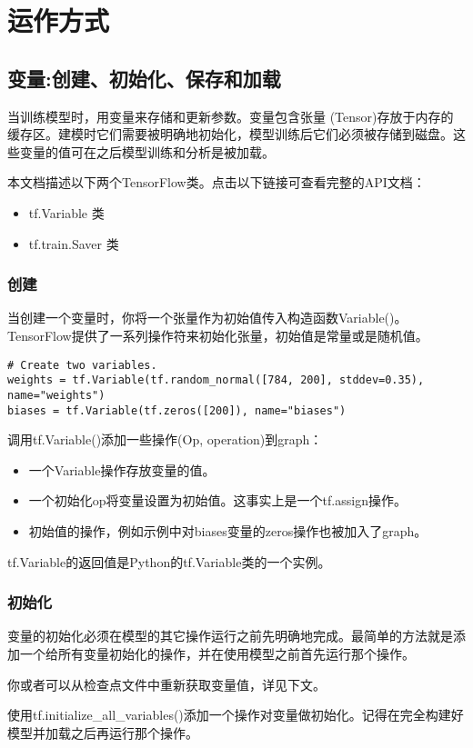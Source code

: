 


\chapter{运作方式}

\section{变量:创建、初始化、保存和加载}

当训练模型时，用变量来存储和更新参数。变量包含张量 (Tensor)存放于内存的缓存区。建模时它们需要被明确地初始化，模型训练后它们必须被存储到磁盘。这些变量的值可在之后模型训练和分析是被加载。

本文档描述以下两个TensorFlow类。点击以下链接可查看完整的API文档：
\begin{itemize}
  \item tf.Variable 类 %
  \item tf.train.Saver 类 %
\end{itemize}

\subsection {创建}

当创建一个变量时，你将一个张量作为初始值传入构造函数Variable()。TensorFlow提供了一系列操作符来初始化张量，初始值是常量或是随机值。

\begin{lstlisting}
# Create two variables.
weights = tf.Variable(tf.random_normal([784, 200], stddev=0.35), name="weights")
biases = tf.Variable(tf.zeros([200]), name="biases")
\end{lstlisting}

调用tf.Variable()添加一些操作(Op, operation)到graph：
\begin{itemize}
  \item 一个Variable操作存放变量的值。
  \item 一个初始化op将变量设置为初始值。这事实上是一个tf.assign操作。
  \item 初始值的操作，例如示例中对biases变量的zeros操作也被加入了graph。
\end{itemize}
tf.Variable的返回值是Python的tf.Variable类的一个实例。

\subsection {初始化}

变量的初始化必须在模型的其它操作运行之前先明确地完成。最简单的方法就是添加一个给所有变量初始化的操作，并在使用模型之前首先运行那个操作。

你或者可以从检查点文件中重新获取变量值，详见下文。

使用tf.initialize\_all\_variables()添加一个操作对变量做初始化。记得在完全构建好模型并加载之后再运行那个操作。